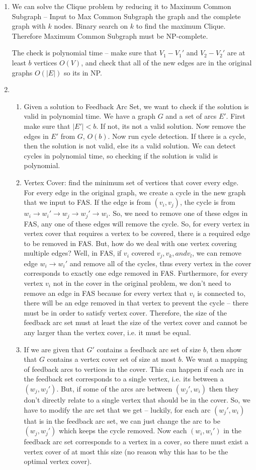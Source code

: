 \documentclass[11pt]{article}
\begin{document}
\begin{enumerate}
\item We can solve the Clique problem by reducing it to Maximum Common Subgraph -- Input to Max Common Subgraph the graph and the complete graph with $k$ nodes. Binary search on $k$ to find the maximum Clique. Therefore Maximum Common Subgraph must be NP-complete.

The check is polynomial time -- make sure  that $V_1-V_1'$ and $V_2-V_2'$ are at least $b$ vertices $O(V)$, and check that all of the new edges are in the original graphs $O(|E|)$ so its in NP.

\newpage
\item 
\begin{enumerate}
\item Given a solution to Feedback Arc Set, we want to check if the solution is valid in polynomial time. We have a graph $G$ and a set of arcs $E'$. First make sure that $|E'|<b$. If not, its not a valid solution. Now remove the edges in $E'$ from $G$, $O(b)$. Now run cycle detection. If there is a cycle, then the solution is not valid, else its a valid solution. We can detect cycles in polynomial time, so checking if the solution is valid is polynomial.
\item Vertex Cover: find the minimum set of vertices that cover every edge. \\
For every edge in the original graph, we create a cycle in the new graph that we input to FAS. If the edge is from $(v_i,v_j)$, the cycle is from $w_i\to w_i'\to w_j\to w_j' \to w_i$. So, we need to remove one of these edges in FAS, any one of these edges will remove the cycle. So, for every vertex in vertex cover that requires a vertex to be covered, there is a required edge to be removed in FAS. But, how do we deal with one vertex covering multiple edges? Well, in FAS, if $v_i$ covered $v_j, v_k, and v_l$, we can remove edge $w_i\to w_i'$ and remove all of the cycles, thus every vertex in the cover corresponds to exactly one edge removed in FAS. Furthermore, for every vertex $v_i$ not in the cover in the original problem, we don't need to remove an edge in FAS because for every vertex that $v_i$ is connected to, there will be an edge removed in that vertex to prevent the cycle -- there must be in order to satisfy vertex cover. Therefore, the size of the feedback arc set must at least the size of the vertex cover and cannot be any larger than the vertex cover, i.e. it must be equal.
\item If we are given that $G'$ contains a feedback arc set of size $b$, then show that $G$ contains a vertex cover set of size at most $b$. We want a mapping of feedback arcs to vertices in the cover. This can happen if each arc in the feedback set corresponds to a single vertex, i.e. its between a $(w_j,w_j')$. But, if some of the arcs are between $(w_j',w_i)$ then they don't directly relate to a single vertex that should be in the cover. So, we have to modify the arc set that we get -- luckily, for each arc $(w_j', w_i)$ that is in the feedback arc set, we can just change the arc to be $(w_j, w_j')$ which keeps the cycle removed. Now each $(w_i,w_i')$ in the feedback arc set corresponds to a vertex in a cover, so there must exist a vertex cover of at most this size (no reason why this has to be the optimal vertex cover).

\end{enumerate}
\end{enumerate}
\end{document}

